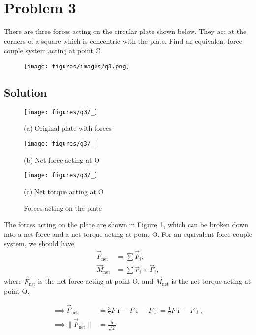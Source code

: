 \section*{Problem 3}

There are three forces acting on the circular plate shown below.
They act at the corners of a square which is concentric with the plate.
Find an equivalent force-couple system acting at point C.

\begin{figure*}[h]
    \centering
    \texttt{[image: figures/images/q3.png]}
\end{figure*}

\subsection*{Solution}

\begin{figure}[htb]
    \centering
    \begin{minipage}{0.375\textwidth}
        \centering
        \texttt{[image: figures/q3/\_]}
        \caption*{
            (a) Original plate with forces
        }
    \end{minipage}\hfill
    \begin{minipage}{0.3\textwidth}
        \centering
        \texttt{[image: figures/q3/\_]}
        \caption*{
            (b) Net force acting at O
        }
    \end{minipage}\hfill
    \begin{minipage}{0.3\textwidth}
        \centering
        \texttt{[image: figures/q3/\_]}
        \caption*{
            (c) Net torque acting at O
        }
    \end{minipage}
    \caption{
        Forces acting on the plate
    }\label{fig:q3}
\end{figure}

The forces acting on the plate are shown in Figure~\ref{fig:q3}, which can be broken down into a net force and a net torque acting at point O.
For an equivalent force-couple system, we should have
\begin{align*}
    \vec{F}_{\text{net}}
     & =
    \sum \vec{F}_i,
    \\
    \vec{M}_{\text{net}}
     & =
    \sum \vec{r}_i \times \vec{F}_i,
\end{align*}
where \(\vec{F}_{\text{net}}\) is the net force acting at point O, and \(\vec{M}_{\text{net}}\) is the net torque acting at point O.

\begin{align*}
    \implies
    \vec{F}_{\text{net}}
     & =
    \frac{3}{2} F \hat\imath - F \hat\imath - F \hat\jmath
    =
    \frac{1}{2} F \hat\imath - F \hat\jmath,
    \\
    \implies
    \lVert \vec{F}_{\text{net}} \rVert
     & =
    \frac{5}{\sqrt{2}}
\end{align*}
